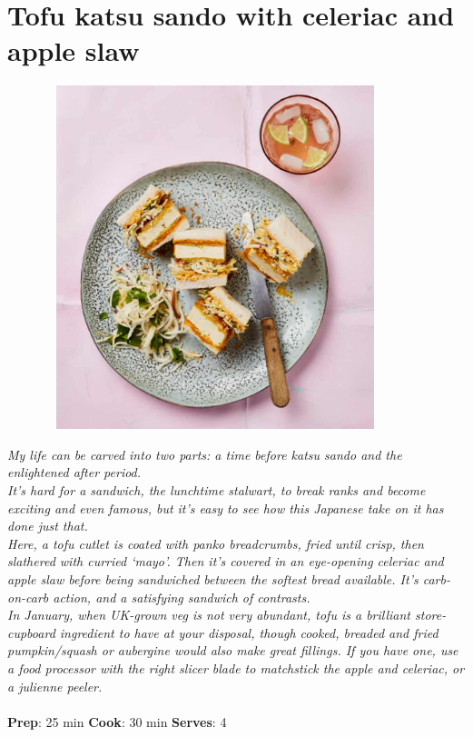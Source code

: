 \documentclass{book}
\begin{document}
\section{Tofu katsu sando with celeriac and apple slaw}
\begin{figure}
\centering\includegraphics[width=10cm,height=10cm,keepaspectratio]{Recipe_Pictures/Tofu_katsu_sando_with_celeriac_and_apple_slaw.png}
\end{figure}
\emph{My life can be carved into two parts: a time before katsu sando and the enlightened after period. \\ 
It’s hard for a sandwich, the lunchtime stalwart, to break ranks and become exciting and even famous, but it’s easy to see how this Japanese take on it has done just that. \\ 
Here, a tofu cutlet is coated with panko breadcrumbs, fried until crisp, then slathered with curried ‘mayo’. Then it’s covered in an eye-opening celeriac and apple slaw before being sandwiched between the softest bread available. It’s carb-on-carb action, and a satisfying sandwich of contrasts.\\ 
In January, when UK-grown veg is not very abundant, tofu is a brilliant store-cupboard ingredient to have at your disposal, though cooked, breaded and fried pumpkin/squash or aubergine would also make great fillings. If you have one, use a food processor with the right slicer blade to matchstick the apple and celeriac, or a julienne peeler.}\\\\ 
\textbf{Prep}: 25 min
\textbf{Cook}: 30 min
\textbf{Serves}: 4
\end{document}
